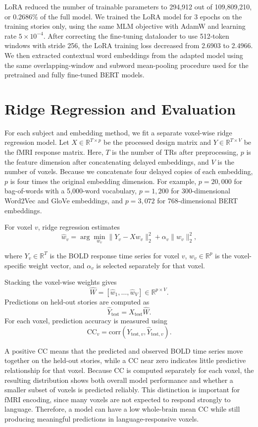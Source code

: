 \documentclass[11pt]{article}
\begin{document}
LoRA reduced the number of trainable parameters to 294,912 out of 109,809,210, or 0.2686\% of the full model. We trained the LoRA model for 3 epochs on the training stories only, using the same MLM objective with AdamW and learning rate $5 \times 10^{-4}$. After correcting the fine-tuning dataloader to use 512-token windows with stride 256, the LoRA training loss decreased from 2.6903 to 2.4966. We then extracted contextual word embeddings from the adapted model using the same overlapping-window and subword mean-pooling procedure used for the pretrained and fully fine-tuned BERT models.

\section{Ridge Regression and Evaluation}
For each subject and embedding method, we fit a separate voxel-wise ridge regression model. Let $X \in \mathbb{R}^{T \times p}$ be the processed design matrix and $Y \in \mathbb{R}^{T \times V}$ be the fMRI response matrix. Here, $T$ is the number of TRs after preprocessing, $p$ is the feature dimension after concatenating delayed embeddings, and $V$ is the number of voxels. Because we concatenate four delayed copies of each embedding, $p$ is four times the original embedding dimension. For example, $p=20{,}000$ for bag-of-words with a 5,000-word vocabulary, $p=1{,}200$ for 300-dimensional Word2Vec and GloVe embeddings, and $p=3{,}072$ for 768-dimensional BERT embeddings.

For voxel \(v\), ridge regression estimates
\[
    \hat{w}_v
    =
    \arg\min_{w_v}
    \|Y_v - Xw_v\|_2^2 + \alpha_v \|w_v\|_2^2,
\]

where \(Y_v \in \mathbb{R}^{T}\) is the BOLD response time series for voxel \(v\), \(w_v \in \mathbb{R}^{p}\) is the voxel-specific weight vector, and \(\alpha_v\) is selected separately for that voxel.

Stacking the voxel-wise weights gives
\[
    \hat{W} = [\hat{w}_1,\ldots,\hat{w}_V] \in \mathbb{R}^{p \times V}.
\]
Predictions on held-out stories are computed as
\[
    \hat{Y}_{\mathrm{test}} = X_{\mathrm{test}}\hat{W}.
\]
For each voxel, prediction accuracy is measured using
\[
    \mathrm{CC}_v =
    \mathrm{corr}\left(Y_{\mathrm{test},v}, \hat{Y}_{\mathrm{test},v}\right).
\]

A positive CC means that the predicted and observed BOLD time series move together on the held-out stories, while a CC near zero indicates little predictive relationship for that voxel. Because CC is computed separately for each voxel, the resulting distribution shows both overall model performance and whether a smaller subset of voxels is predicted reliably. This distinction is important for fMRI encoding, since many voxels are not expected to respond strongly to language. Therefore, a model can have a low whole-brain mean CC while still producing meaningful predictions in language-responsive voxels.
\end{document}
